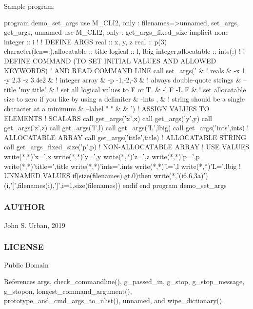 Sample program\+: \begin{DoxyVerb}program demo_set_args
use M_CLI2,  only : filenames=>unnamed, set_args, get_args, unnamed
use M_CLI2,  only : get_args_fixed_size
implicit none
integer                      :: i
!
! DEFINE ARGS
real                         :: x, y, z
real                         :: p(3)
character(len=:),allocatable :: title
logical                      :: l, lbig
integer,allocatable          :: ints(:)
!
!  DEFINE COMMAND (TO SET INITIAL VALUES AND ALLOWED KEYWORDS)
!  AND READ COMMAND LINE
call set_args(' &
   ! reals
   & -x 1 -y 2.3 -z 3.4e2 &
   ! integer array
   & -p -1,-2,-3 &
   ! always double-quote strings
   & --title "my title" &
   ! set all logical values to F or T.
   & -l F -L F &
   ! set allocatable size to zero if you like by using a delimiter
   & -ints , &
   ! string should be a single character at a minimum
   & --label " " &
   & ')
! ASSIGN VALUES TO ELEMENTS
!     SCALARS
call get_args('x',x)
call get_args('y',y)
call get_args('z',z)
call get_args('l',l)
call get_args('L',lbig)
call get_args('ints',ints)      ! ALLOCATABLE ARRAY
call get_args('title',title)    ! ALLOCATABLE STRING
call get_args_fixed_size('p',p) ! NON-ALLOCATABLE ARRAY
! USE VALUES
write(*,*)'x=',x
write(*,*)'y=',y
write(*,*)'z=',z
write(*,*)'p=',p
write(*,*)'title=',title
write(*,*)'ints=',ints
write(*,*)'l=',l
write(*,*)'L=',lbig
! UNNAMED VALUES
if(size(filenames).gt.0)then
   write(*,'(i6.6,3a)')(i,'[',filenames(i),']',i=1,size(filenames))
endif
end program demo_set_args
\end{DoxyVerb}


\subsubsection*{A\+U\+T\+H\+OR}

John S. Urban, 2019 \subsubsection*{L\+I\+C\+E\+N\+SE}

Public Domain 

References args, check\+\_\+commandline(), g\+\_\+passed\+\_\+in, g\+\_\+stop, g\+\_\+stop\+\_\+message, g\+\_\+stopon, longest\+\_\+command\+\_\+argument(), prototype\+\_\+and\+\_\+cmd\+\_\+args\+\_\+to\+\_\+nlist(), unnamed, and wipe\+\_\+dictionary().

